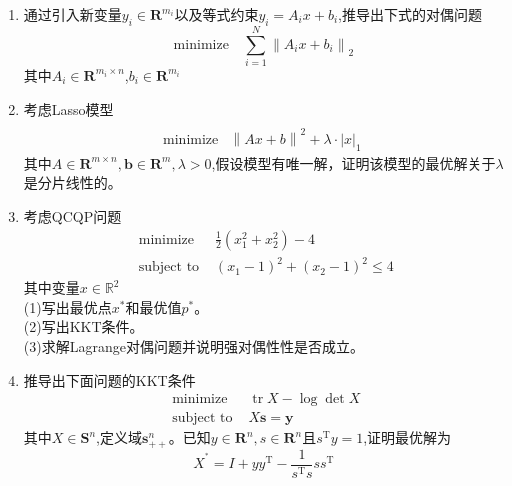 \documentclass[handout,10pt]{beamer}
\begin{document}
\begin{frame}[allowframebreaks]
\begin{enumerate}
  	\item 通过引入新变量${y_{i}\in\mathbf{R}^{m_{i}}}$以及等式约束${y_{i}=A_{i}x+b_{i}}$,推导出下式的对偶问题\\
     \begin{equation}
	\mathrm{minimize}\quad\sum_{i=1}^N\left\|A_ix+b_i\right\|_2
	\end{equation}
  其中${A_{i}\in\mathbf{R}^{m_{i}\times n}}$,${b_{i}\in\mathbf{R}^{m_{i}}}$

\item 考虑Lasso模型
\begin{equation}
	\begin{array}{ll}\\
\text{minimize}&\left\|Ax+b\right\|^2+\lambda\cdot\left|x\right|_1\
     \end{array}
	\end{equation}
其中${A\in\mathbf{R}^{m\times n},\boldsymbol{b}\in\mathbf{R}^{m},\lambda>0}$,假设模型有唯一解，证明该模型的最优解关于${\lambda}$是分片线性的。
\item 考虑QCQP问题
           \begin{equation}
		\begin{array}{ll}
		\text{ minimize }& \frac{1}{2}(x_1^2+x_2^2)-4\\
		\text { subject to }& (x_{1}-1)^{2}+(x_{2}-1)^{2}\leqslant4
		\end{array}
	     \end{equation} 
其中变量${x\in\mathbb{R}^{2}}$\\
(1)写出最优点${x^{*}}$和最优值${p^{*}}$。\\
(2)写出KKT条件。\\
(3)求解Lagrange对偶问题并说明强对偶性性是否成立。
\item 推导出下面问题的KKT条件
           \begin{equation}
		\begin{array}{ll}
		\text{ minimize }& \operatorname{tr}X-\log\det X\\
		\text { subject to }& X\boldsymbol{s}=\boldsymbol{y}
		\end{array}
	     \end{equation} 
其中${X\in\mathbf{S}^{n}}$,定义域${\mathbf{s}_{++}^{n}}$。已知${y\in\mathbf{R}^{n},s\in\mathbf{R}^{n}}$且${s^{\mathrm{T}}y=1}$,证明最优解为
          \begin{equation}
X^{^{*}}=I+yy^{\mathrm{T}}-\frac{1}{s^{\mathrm{T}}s}ss^{\mathrm{T}}
          \end{equation}
\end{enumerate}
\end{frame}
\end{document}
